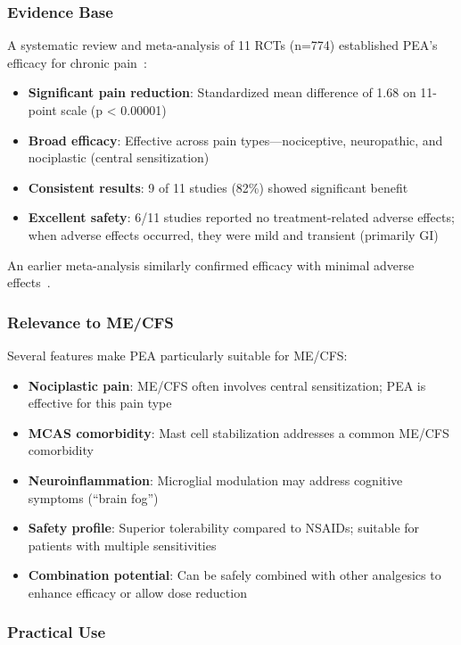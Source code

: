\subsubsection{Evidence Base}

A systematic review and meta-analysis of 11 RCTs (n=774) established PEA's efficacy for chronic pain~\cite{LangIlievich2023PEA}:
\begin{itemize}
    \item \textbf{Significant pain reduction}: Standardized mean difference of 1.68 on 11-point scale (p < 0.00001)
    \item \textbf{Broad efficacy}: Effective across pain types---nociceptive, neuropathic, and nociplastic (central sensitization)
    \item \textbf{Consistent results}: 9 of 11 studies (82\%) showed significant benefit
    \item \textbf{Excellent safety}: 6/11 studies reported no treatment-related adverse effects; when adverse effects occurred, they were mild and transient (primarily GI)
\end{itemize}

An earlier meta-analysis similarly confirmed efficacy with minimal adverse effects~\cite{Artukoglu2017PEA}.

\subsubsection{Relevance to ME/CFS}

Several features make PEA particularly suitable for ME/CFS:
\begin{itemize}
    \item \textbf{Nociplastic pain}: ME/CFS often involves central sensitization; PEA is effective for this pain type
    \item \textbf{MCAS comorbidity}: Mast cell stabilization addresses a common ME/CFS comorbidity
    \item \textbf{Neuroinflammation}: Microglial modulation may address cognitive symptoms (``brain fog'')
    \item \textbf{Safety profile}: Superior tolerability compared to NSAIDs; suitable for patients with multiple sensitivities
    \item \textbf{Combination potential}: Can be safely combined with other analgesics to enhance efficacy or allow dose reduction
\end{itemize}

\subsubsection{Practical Use}


